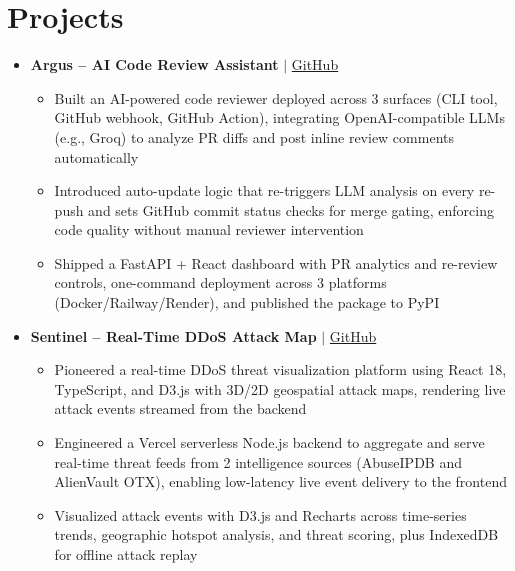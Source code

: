 \documentclass[11pt,a4paper,sans]{moderncv}
\begin{document}
\section{Projects}
\vspace{1pt}
\begin{itemize}

\item \textbf{Argus -- AI Code Review Assistant} $\vert$ \href{https://github.com/sisodiajatin/Argus---Ai-Code-Review-Assistant}{GitHub}
\begin{itemize}
    \item Built an AI-powered code reviewer deployed across 3 surfaces (CLI tool, GitHub webhook, GitHub Action), integrating OpenAI-compatible LLMs (e.g., Groq) to analyze PR diffs and post inline review comments automatically
    \item Introduced auto-update logic that re-triggers LLM analysis on every re-push and sets GitHub commit status checks for merge gating, enforcing code quality without manual reviewer intervention
    \item Shipped a FastAPI + React dashboard with PR analytics and re-review controls, one-command deployment across 3 platforms (Docker/Railway/Render), and published the package to PyPI
\end{itemize}

\vspace{3pt}

\item \textbf{Sentinel -- Real-Time DDoS Attack Map} $\vert$ \href{https://github.com/sisodiajatin/Sentinel-DDos-Attack-Map}{GitHub}
\begin{itemize}
    \item Pioneered a real-time DDoS threat visualization platform using React 18, TypeScript, and D3.js with 3D/2D geospatial attack maps, rendering live attack events streamed from the backend
    \item Engineered a Vercel serverless Node.js backend to aggregate and serve real-time threat feeds from 2 intelligence sources (AbuseIPDB and AlienVault OTX), enabling low-latency live event delivery to the frontend
    \item Visualized attack events with D3.js and Recharts across time-series trends, geographic hotspot analysis, and threat scoring, plus IndexedDB for offline attack replay
\end{itemize}

\vspace{3pt}


\end{itemize}
\end{document}
